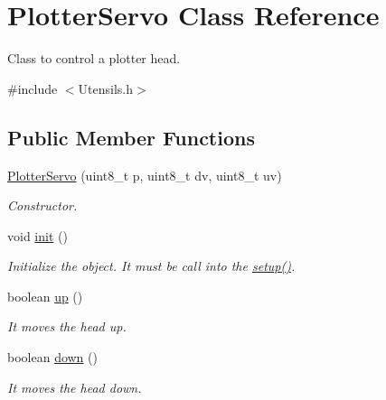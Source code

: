 \hypertarget{class_plotter_servo}{\section{Plotter\+Servo Class Reference}
\label{class_plotter_servo}
}


Class to control a plotter head.  




{\ttfamily \#include $<$Utensils.\+h$>$}

\subsection*{Public Member Functions}
\begin{DoxyCompactItemize}
\item 
\hyperlink{class_plotter_servo_a3e1bb246a0c6b6df9f78b1a5a9343ef0}{Plotter\+Servo} (uint8\+\_\+t p, uint8\+\_\+t dv, uint8\+\_\+t uv)
\begin{DoxyCompactList}\small\item\em Constructor. \end{DoxyCompactList}\item 
void \hyperlink{class_plotter_servo_ad35c8f57eaeeffa768340a777c105aeb}{init} ()
\begin{DoxyCompactList}\small\item\em Initialize the object. It must be call into the \hyperlink{easy___c_n_c_8cpp_a4fc01d736fe50cf5b977f755b675f11d}{setup()}. \end{DoxyCompactList}\item 
boolean \hyperlink{class_plotter_servo_ab3d7dc74cd89c962a9cf27bdd210653f}{up} ()
\begin{DoxyCompactList}\small\item\em It moves the head up. \end{DoxyCompactList}\item 
boolean \hyperlink{class_plotter_servo_a06411670f5c5799ec84be0cffda3772b}{down} ()
\begin{DoxyCompactList}\small\item\em It moves the head down. \end{DoxyCompactList}\end{DoxyCompactItemize}
